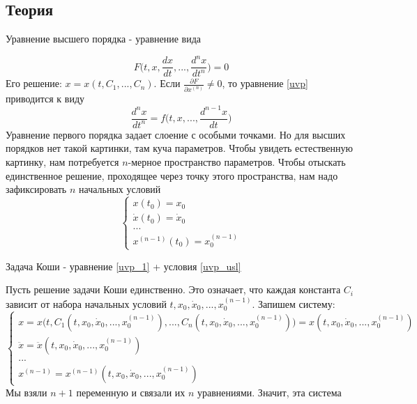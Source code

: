 \subsection{Теория}
\begin{defin}
Уравнение высшего порядка - уравнение вида
\end{defin}
\begin{equation} \label{uvp}
    F\bigg(t,x,\frac{dx}{dt},...,\frac{d^{n}x}{dt^n}\bigg)=0
\end{equation}
Его решение: $x=x(t,C_1,...,C_n)$. 
Если $\frac{\partial F}{\partial x^{(n)}}\ne 0$, то уравнение \ref{uvp}
приводится к виду
\begin{equation}\label{uvp_1}
    \frac{d^nx}{dt^n}=f\bigg(t,x,...,\frac{d^{n-1}x}{dt}\bigg)
\end{equation}
Уравнение первого порядка задает слоение с особыми точками. Но для высших
порядков нет такой картинки, там куча параметров. Чтобы увидеть естественную
картинку, нам потребуется $n$-мерное пространство параметров. Чтобы 
отыскать единственное решение, проходящее через точку этого пространства, 
нам надо зафиксировать  $n$ начальных условий
\begin{equation}\label{uvp_usl}
 \begin{cases}
     x(t_0)=x_0\\ \dot x(t_0)=\dot x_0\\...\\x^{(n-1)}(t_0)=x_0^{(n-1)}
 \end{cases}
\end{equation}
\begin{defin}
    Задача Коши - уравнение \ref{uvp_1} + условия \ref{uvp_usl}
\end{defin}
Пусть решение задачи Коши единственно. Это означает, что каждая константа
$C_i$ зависит от набора начальных условий 
$t,x_0,\dot x_0,...,x_0^{(n-1)}$.
Запишем систему:
\begin{equation*}
\begin{cases}
  x=x\Big(t,C_1(t,x_0,\dot x_0,...,x_0^{(n-1)}),...,C_n(t,x_0,\dot x_0,...,x_0^{(n-1)})\Big) = 
    x(t,x_0,\dot x_0,...,x_0^{(n-1)})\\
    \ddot x = \ddot x(t,x_0,\dot x_0,...,x_0^{(n-1)})\\
    ...\\
    x^{(n-1)}=x^{(n-1)}(t,x_0,\dot x_0,...,x_0^{(n-1)}) \end{cases}  
\end{equation*}
Мы взяли $n+1$ переменную и связали их  $n$ уравнениями. Значит, эта система
